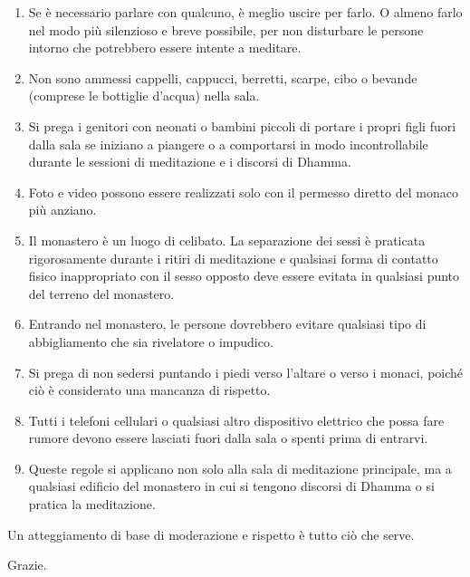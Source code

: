 \begin{enumerate}
\item Se è necessario parlare con qualcuno, è meglio uscire per farlo. O almeno farlo nel modo più silenzioso e breve possibile, per non disturbare le persone intorno che potrebbero essere intente a meditare.

\item Non sono ammessi cappelli, cappucci, berretti, scarpe, cibo o bevande (comprese le bottiglie d'acqua) nella sala.

\item Si prega i genitori con neonati o bambini piccoli di portare i propri figli fuori dalla sala se iniziano a piangere o a comportarsi in modo incontrollabile durante le sessioni di meditazione e i discorsi di Dhamma.

\item Foto e video possono essere realizzati solo con il permesso diretto del monaco più anziano.

\item Il monastero è un luogo di celibato. La separazione dei sessi è praticata rigorosamente durante i ritiri di meditazione e qualsiasi forma di contatto fisico inappropriato con il sesso opposto deve essere evitata in qualsiasi punto del terreno del monastero.

\item Entrando nel monastero, le persone dovrebbero evitare qualsiasi tipo di abbigliamento che sia rivelatore o impudico.

\item Si prega di non sedersi puntando i piedi verso l'altare o verso i monaci, poiché ciò è considerato una mancanza di rispetto.

\item Tutti i telefoni cellulari o qualsiasi altro dispositivo elettrico che possa fare rumore devono essere lasciati fuori dalla sala o spenti prima di entrarvi.

\item Queste regole si applicano non solo alla sala di meditazione principale, ma a qualsiasi edificio del monastero in cui si tengono discorsi di Dhamma o si pratica la meditazione.
\end{enumerate}
Un atteggiamento di base di moderazione e rispetto è tutto ciò che serve.

Grazie.
